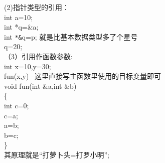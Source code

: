 \documentclass[a4paper,12pt]{article}
\begin{document}
\begin{CJK*}{UTF8}{gbsn}
\begin{flushleft}
 (2)指针类型的引用：\\
\qquad int a=10;\\
\qquad int *q=\&a;\\
\qquad int \verb|*&|q=p;   就是比基本数据类型多了个星号\\
\qquad *q=20;\\
（3）引用作函数参数:\\
int x=10,y=30;\\
fun(x,y)     --这里直接写主函数里使用的目标变量即可\\
void fun(int \&a,int \&b)\\
\{\\
\qquad   int c=0;\\
\qquad   c=a;\\
\qquad   a=b;\\
\qquad   b=c;\\
\}\\
其原理就是“打萝卜头=打罗小明”;\\
\end{flushleft}


\end{CJK*}
\end{document}
